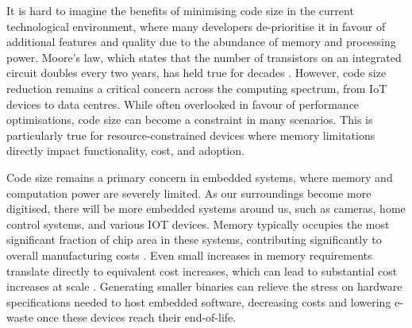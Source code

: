 


It is hard to imagine the benefits of minimising code size in the current technological environment, where many developers de-prioritise it in favour of additional features and quality due to the abundance of memory and processing power. Moore's law, which states that the number of transistors on an integrated circuit doubles every two years, has held true for decades \cite{MooresLaw}. However, code size reduction remains a critical concern across the computing spectrum, from IoT devices to data centres. While often overlooked in favour of performance optimisations, code size can become a constraint in many scenarios. This is particularly true for resource-constrained devices where memory limitations directly impact functionality, cost, and adoption.


Code size remains a primary concern in embedded systems, where memory and computation power are severely limited. As our surroundings become more digitised, there will be more embedded systems around us, such as cameras, home control systems, and various IOT devices. Memory typically occupies the most significant fraction of chip area in these systems, contributing significantly to overall manufacturing costs \cite{EmbeddedSystemMemoryArea}. Even small increases in memory requirements translate directly to equivalent cost increases, which can lead to substantial cost increases at scale \cite{EmbeddedSystemMemoryCost}. Generating smaller binaries can relieve the stress on hardware specifications needed to host embedded software, decreasing costs and lowering e-waste once these devices reach their end-of-life.

